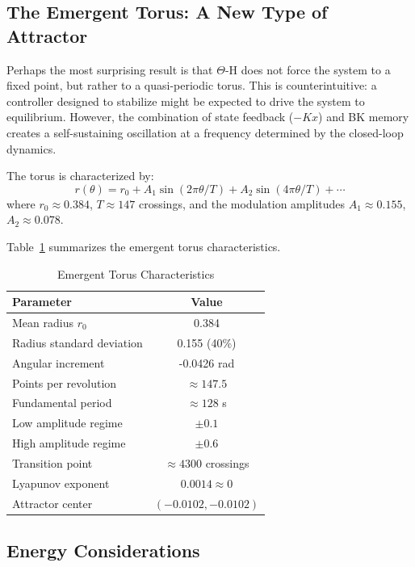\documentclass[twocolumn]{article}
\begin{document}
\subsection{The Emergent Torus: A New Type of Attractor}

Perhaps the most surprising result is that $\Theta$-H does not force the 
system to a fixed point, but rather to a quasi-periodic torus. 
This is counterintuitive: a controller designed to stabilize might be 
expected to drive the system to equilibrium. However, the combination 
of state feedback ($-Kx$) and BK memory creates a self-sustaining 
oscillation at a frequency determined by the closed-loop dynamics.

The torus is characterized by:
\begin{equation}
r(\theta) = r_0 + A_1 \sin(2\pi \theta / T) + A_2 \sin(4\pi \theta / T) + \cdots
\label{eq:torus}
\end{equation}
where $r_0 \approx 0.384$, $T \approx 147$ crossings, and the modulation 
amplitudes $A_1 \approx 0.155$, $A_2 \approx 0.078$.

Table~\ref{tab:torus_params} summarizes the emergent torus characteristics.

\begin{table}[htb]
\centering
\caption{Emergent Torus Characteristics}
\label{tab:torus_params}
{\small
\begin{tabular}{|l|c|}
\hline
\textbf{Parameter} & \textbf{Value} \\
\hline
Mean radius $r_0$ & 0.384 \\
\hline
Radius standard deviation & 0.155 (40\%) \\
\hline
Angular increment & -0.0426 rad \\
\hline
Points per revolution & $\approx 147.5$ \\
\hline
Fundamental period & $\approx 128$ s \\
\hline
Low amplitude regime & $\pm 0.1$ \\
\hline
High amplitude regime & $\pm 0.6$ \\
\hline
Transition point & $\approx 4300$ crossings \\
\hline
Lyapunov exponent & $0.0014 \approx 0$ \\
\hline
Attractor center & $(-0.0102, -0.0102)$ \\
\hline
\end{tabular}
}
\end{table}

\subsection{Energy Considerations}
\end{document}
